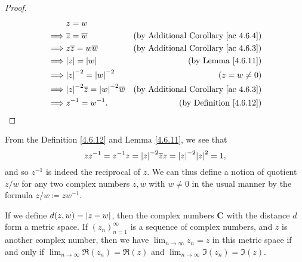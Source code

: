 \begin{proof}
    \begin{align*}
                 & z = w                                                                                                     \\
        \implies & \overline{z} = \overline{w}                             & \text{(by Additional Corollary \ref{ac 4.6.4})} \\
        \implies & z \overline{z} = w \overline{w}                         & \text{(by Additional Corollary \ref{ac 4.6.3})} \\
        \implies & \abs*{z} = \abs*{w}                                     & \text{(by Lemma \ref{4.6.11})}                  \\
        \implies & \abs*{z}^{-2} = \abs*{w}^{-2}                           & (z = w \neq 0)                                  \\
        \implies & \abs*{z}^{-2} \overline{z} = \abs*{w}^{-2} \overline{w} & \text{(by Additional Corollary \ref{ac 4.6.3})} \\
        \implies & z^{-1} = w^{-1}.                                        & \text{(by Definition \ref{4.6.12})}
    \end{align*}
\end{proof}

\begin{note}
    From the Definition \ref{4.6.12} and Lemma \ref{4.6.11}, we see that
    \[
        z z^{-1} = z^{-1} z = \abs*{z}^{-2} \overline{z} z = \abs*{z}^{-2} \abs*{z}^2 = 1,
    \]
    and so \(z^{-1}\) is indeed the reciprocal of \(z\).
    We can thus define a notion of quotient \(z / w\) for any two complex numbers \(z, w\) with \(w \neq 0\) in the usual manner by the formula \(z / w \coloneqq z w^{-1}\).
\end{note}

\begin{lemma}\label{4.6.13}
    If we define \(d(z, w) = \abs*{z - w}\), then the complex numbers \(\mathbf{C}\) with the distance \(d\) form a metric space.
    If \((z_n)_{n = 1}^\infty\) is a sequence of complex numbers, and \(z\) is another complex number, then we have \(\lim_{n \to \infty} z_n = z\) in this metric space if and only if \(\lim_{n \to \infty} \Re(z_n) = \Re(z)\) and \(\lim_{n \to \infty} \Im(z_n) = \Im(z)\).
\end{lemma}

